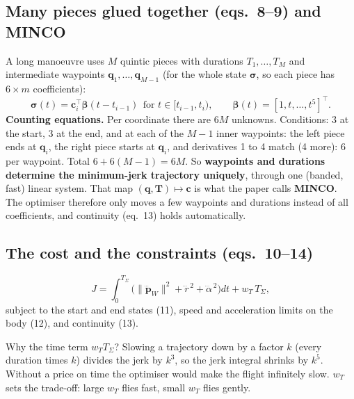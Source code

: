 \documentclass[11pt,a4paper]{article}
\newcommand{\vect}[1]{\mathbf{#1}}
\newcommand{\T}{^{\top}}
\begin{document}
\subsection{Many pieces glued together (eqs.~8--9) and MINCO}
A long manoeuvre uses $M$ quintic pieces with durations $T_1,\dots,T_M$ and intermediate waypoints
$\vect{q}_1,\dots,\vect{q}_{M-1}$ (for the whole state $\bm\sigma$, so each piece has $6\times m$ coefficients):
\[
\bm\sigma(t)=\vect{c}_i\T\bm\beta(t-t_{i-1})\ \ \text{for }t\in[t_{i-1},t_i),\qquad\bm\beta(t)=[1,t,\dots,t^5]\T.
\tag{8--9}
\]
\textbf{Counting equations.} Per coordinate there are $6M$ unknowns. Conditions: 3 at the start, 3 at the end, and at
each of the $M-1$ inner waypoints: the left piece ends at $\vect{q}_i$, the right piece starts at $\vect{q}_i$, and
derivatives 1 to 4 match (4 more): 6 per waypoint. Total $6+6(M-1)=6M$. So \textbf{waypoints and durations determine
the minimum-jerk trajectory uniquely}, through one (banded, fast) linear system. That map
$(\vect{q},\vect{T})\mapsto\vect{c}$ is what the paper calls \textbf{MINCO}. The optimiser therefore only moves a few
waypoints and durations instead of all coefficients, and continuity (eq.~13) holds automatically.

\subsection{The cost and the constraints (eqs.~10--14)}
\begin{equation}
J=\int_0^{T_\Sigma}\Big(\|\dddot{\vect{p}}_W\|^2+\dddot r^{\,2}+\dddot\alpha^{\,2}\Big)dt+w_T\,T_\Sigma ,\tag{10}
\end{equation}
subject to the start and end states (11), speed and acceleration limits on the body (12), and continuity (13).

\begin{plainbox}
Why the time term $w_TT_\Sigma$? Slowing a trajectory down by a factor $k$ (every duration times $k$) divides the jerk
by $k^3$, so the jerk integral shrinks by $k^5$. Without a price on time the optimiser would make the flight
infinitely slow. $w_T$ sets the trade-off: large $w_T$ flies fast, small $w_T$ flies gently.
\end{plainbox}
\end{document}
